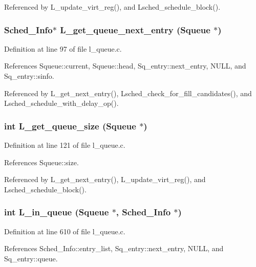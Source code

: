 Referenced by L\_\-update\_\-virt\_\-reg(), and Lsched\_\-schedule\_\-block().
\subsubsection{\setlength{\rightskip}{0pt plus 5cm}\bf{Sched\_\-Info}$\ast$ L\_\-get\_\-queue\_\-next\_\-entry (\bf{Squeue} $\ast$)}\label{l__schedule_8h_b9dfd4272b10bda2f8fc386fc01fa49c}




Definition at line 97 of file l\_\-queue.c.

References Squeue::current, Squeue::head, Sq\_\-entry::next\_\-entry, NULL, and Sq\_\-entry::sinfo.

Referenced by L\_\-get\_\-next\_\-entry(), Lsched\_\-check\_\-for\_\-fill\_\-candidates(), and Lsched\_\-schedule\_\-with\_\-delay\_\-op().
\subsubsection{\setlength{\rightskip}{0pt plus 5cm}int L\_\-get\_\-queue\_\-size (\bf{Squeue} $\ast$)}\label{l__schedule_8h_7c88d211fbea7f5590420724fc97091c}




Definition at line 121 of file l\_\-queue.c.

References Squeue::size.

Referenced by L\_\-get\_\-next\_\-entry(), L\_\-update\_\-virt\_\-reg(), and Lsched\_\-schedule\_\-block().
\subsubsection{\setlength{\rightskip}{0pt plus 5cm}int L\_\-in\_\-queue (\bf{Squeue} $\ast$, \bf{Sched\_\-Info} $\ast$)}\label{l__schedule_8h_a5622848600459f67a920a9b2cce7bea}




Definition at line 610 of file l\_\-queue.c.

References Sched\_\-Info::entry\_\-list, Sq\_\-entry::next\_\-entry, NULL, and Sq\_\-entry::queue.

